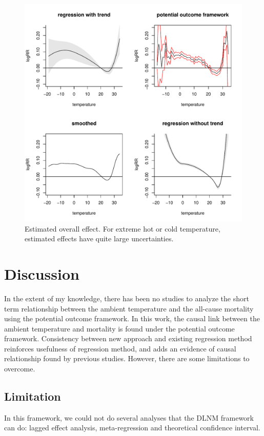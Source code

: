 \documentclass[12pt]{article}
\begin{document}
\begin{figure}
	\includegraphics[width = \textwidth]{figures/main1.pdf}
	\caption[Figure 1.]{Estimated overall effect. 
	For extreme hot or cold temperature, estimated effects have quite large uncertainties.}
\end{figure}

\section{Discussion}

In the extent of my knowledge, there has been no studies to analyze the short term relationship 
between the ambient temperature and the all-cause mortality using the potential outcome framework.
In this work, the causal link between the ambient temperature and mortality 
is found under the potential outcome framework.
Consistency between new approach and existing regression method reinforces
usefulness of regression method, and adds an evidence of causal relationship found by previous studies.
However, there are some limitations to overcome.


\subsection{Limitation}

In this framework, we could not do several analyses that the DLNM framework can do:
lagged effect analysis, meta-regression and theoretical confidence interval.
\end{document}
